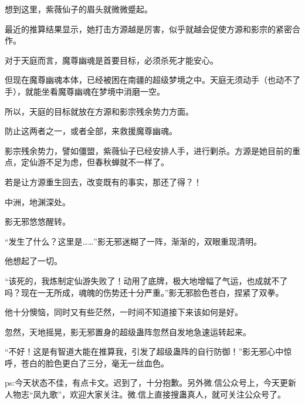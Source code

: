 \begin{this_body}
想到这里，紫薇仙子的眉头就微微蹙起。

最近的推算结果显示，她打击方源越是厉害，似乎就越会促使方源和影宗的紧密合作。

对于天庭而言，魔尊幽魂是首要目标，必须杀死才能安心。

但现在魔尊幽魂本体，已经被困在南疆的超级梦境之中。天庭无须动手（也动不了手），就能坐看魔尊幽魂在梦境中消磨一空。

所以，天庭的目标就放在方源和影宗残余势力方面。

防止这两者之一，或者全部，来救援魔尊幽魂。

影宗残余势力，譬如僵盟，紫薇仙子已经安排人手，进行剿杀。方源是她目前的重点，定仙游不足为虑，但春秋蝉就不一样了。

若是让方源重生回去，改变既有的事实，那还了得？！

中洲，地渊深处。

影无邪悠悠醒转。

“发生了什么？这里是……”影无邪迷糊了一阵，渐渐的，双眼重现清明。

他想起了一切。

“该死的，我炼制定仙游失败了！动用了底牌，极大地增幅了气运，也成就不了吗？现在一无所成，魂魄的伤势还十分严重。”影无邪脸色苍白，捏紧了双拳。

他十分懊恼，同时又有些茫然，一时间不知道接下来该如何是好。

忽然，天地摇晃，影无邪置身的超级蛊阵忽然自发地急速运转起来。

“不好！这是有智道大能在推算我，引发了超级蛊阵的自行防御！”影无邪心中惊呼，苍白的脸色更白了三分，毫无一丝血色。

ps:今天状态不佳，有点卡文。迟到了，十分抱歉。另外微.信公众号上，今天更新人物志“凤九歌”，欢迎大家关注。微.信上直接搜蛊真人，就可关注公众号了。

\end{this_body}


